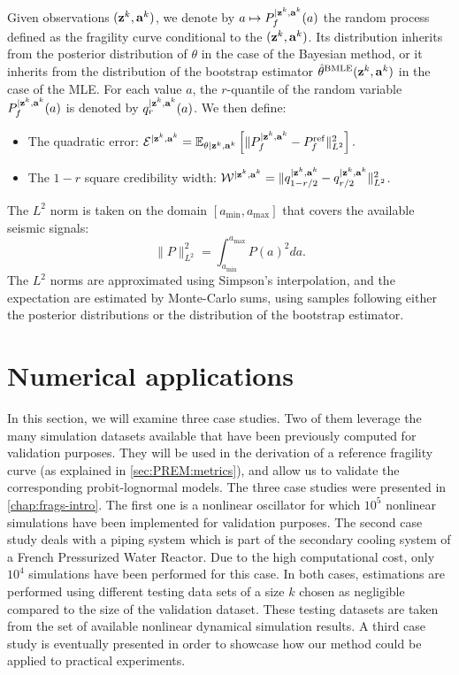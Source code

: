 Given observations $(\mathbf{z}^k,\mathbf{a}^k)$, we denote by $a\mapsto P_f^{|\mathbf{z}^k,\mathbf{a}^k}(a)$ the random process defined as the fragility curve conditional to the $(\mathbf{z}^k,\mathbf{a}^k)$. Its distribution inherits from the posterior distribution of $\theta$ in the case of the Bayesian method, or it inherits from the distribution of the bootstrap estimator $\hat\theta^{\text{BMLE}}(\mathbf{z}^k,\mathbf{a}^k)$ in the case of the MLE.
For each value $a$, the $r$-quantile of the random variable $P_f^{|\mathbf{z}^k,\mathbf{a}^k}(a)$ is denoted by $q_r^{|\mathbf{z}^k,\mathbf{a}^k}(a)$. We then define:
\begin{itemize}
    \item The quadratic error: $\mathcal{E}^{|\mathbf{z}^k,\mathbf{a}^k}=\mathbb{E}_{\theta|\mathbf{z}^k,\mathbf{a}^k}\left[\|P_f^{|\mathbf{z}^k,\mathbf{a}^k}-P_f^{\mathrm{ref}} \|^2_{L^2}\right].$
        \item The $1-r$ square credibility width: $\mathcal{W}^{|\mathbf{z}^k,\mathbf{a}^k}= \|q_{1-{r/2}}^{|\mathbf{z}^k,\mathbf{a}^k} - q_{{r/2}}^{|\mathbf{z}^k,\mathbf{a}^k}\|_{L^2}^2$.
\end{itemize}
The $L^2$ norm is taken on the domain $[a_{\text{min}},a_{\text{max}}]$ that covers  the available seismic signals: 
\begin{equation}
    \|P\|^2_{L^2} = \int_{a_{\text{min}}}^{a_{\text{max}}} P(a)^2da.    
\end{equation}
The $L^2$ norms are approximated using Simpson's interpolation, and the expectation are estimated by Monte-Carlo sums, using samples following either the posterior distributions or the distribution of the bootstrap estimator. 









\section{Numerical applications}\label{sec:PREM:numapp}


In this section, we will examine three case studies.
Two of them leverage the many simulation datasets available that have been previously computed for validation purposes. They will be used in the derivation of a reference fragility curve (as explained in \cref{sec:PREM:metrics}), and allow us to validate the corresponding probit-lognormal models. 
The three case studies were presented in   \cref{chap:frags-intro}. The first one is a nonlinear oscillator
for which $10^5$ nonlinear simulations have been implemented for validation purposes. The second case study deals with a piping system which is part of the secondary cooling system of a French Pressurized Water Reactor. Due to the high computational cost, only $10^4$ simulations have been performed for this case. In both cases, estimations are performed using different testing data sets of a size $k$ chosen as negligible compared to the size of the validation dataset. These testing datasets are taken from the set of available nonlinear dynamical simulation results. {A third case study is eventually presented %
in order to showcase how our method could be applied to practical experiments.}





